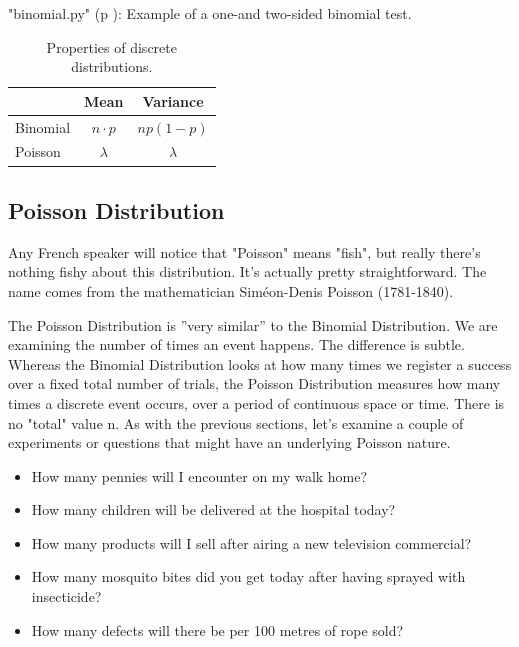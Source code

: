 \PyImg "binomial.py" (p \pageref{py:binomial}): Example of a one-and two-sided binomial test.

\begin{table}[h]
  \centering
  \begin{tabular}{l|c|c|}
      & Mean & Variance \\
      \hline
      Binomial & $n \cdot p$ & $np(1-p)$ \\
      Poisson & $\lambda$ & $\lambda$ \\
  \end{tabular}
\caption{Properties of discrete distributions.}
\end{table}

\subsection{Poisson Distribution}

Any French speaker will notice that "Poisson" means "fish", but really there's nothing fishy about this distribution. It's actually pretty straightforward. The name comes from the mathematician Siméon-Denis Poisson (1781-1840).

The Poisson Distribution is ''very similar'' to the Binomial Distribution. We are examining the number of times an event happens. The difference is subtle. Whereas the Binomial Distribution looks at how many times we register a success over a fixed total number of trials, the Poisson Distribution measures how many times a discrete event occurs, over a period of continuous space or time. There is no "total" value n. As with the previous sections, let's examine a couple of experiments or questions that might have an underlying Poisson nature.

\begin{itemize}
  \item How many pennies will I encounter on my walk home?
  \item How many children will be delivered at the hospital today?
  \item How many products will I sell after airing a new television commercial?
  \item How many mosquito bites did you get today after having sprayed with insecticide?
  \item How many defects will there be per 100 metres of rope sold?
\end{itemize}

